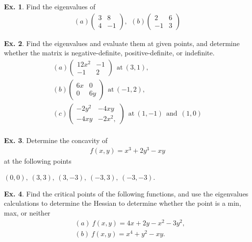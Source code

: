 \documentclass[10pt,a4paper]{book}
\theoremstyle{definition}\newtheorem{definition}{Definition}
\theoremstyle{definition}\newtheorem{fact}{Fact}
\theoremstyle{definition}\newtheorem{ex}{Ex.}
\theoremstyle{definition}\newtheorem{project}{Project}
\theoremstyle{definition}\newtheorem{problem}{Problem}
\theoremstyle{definition}\newtheorem{example}{Example}
\numberwithin{theorem}{chapter}
\numberwithin{corollary}{chapter}
\numberwithin{assumption}{chapter}
\numberwithin{definition}{chapter}
\numberwithin{prop}{chapter}
\numberwithin{notation}{chapter}
\numberwithin{problem}{chapter}
\numberwithin{example}{chapter}
\numberwithin{fact}{chapter}
\numberwithin{ex}{chapter}
\begin{document}
	
	\begin{ex}
		Find the eigenvalues of
		\begin{align*}
			(a) \begin{pmatrix}
				3 & 8 \\ 4 & - 1
			\end{pmatrix}, \ \ (b) \begin{pmatrix}
				2 & 6 \\ - 1 & 3
			\end{pmatrix}
		\end{align*}
	\end{ex}
	

	\begin{ex}
		Find the eigenvalues and evaluate them at given points, and determine whether the matrix is negative-definite, positive-definite, or indefinite.
		\begin{align*}
			(a) \begin{pmatrix}
				12 x^2 & -1   \\ -1 & 2
			\end{pmatrix} \ \ \text{at} \ (3,1), \\
			(b) \begin{pmatrix}
				6x     & 0    \\ 0 & 6y
			\end{pmatrix} \ \ \text{at} \ (-1,2), \\
			(c) \begin{pmatrix}
				-2y^2  & -4xy \\ -4xy & -2 x^2,
			\end{pmatrix} \ \ \text{at} \ (1,-1) \ \ \text{and} \ \ (1,0) \\
		\end{align*}
	\end{ex}
	
	\begin{ex}
		Determine the concavity of 
		\begin{align*}
			f(x,y) = x^3 + 2y^3 - xy 
		\end{align*}
		at the following points
		
		$(0,0), \ (3,3), \ (3,-3), \ (-3,3), \ (-3,-3)$.
	\end{ex}
	
	\begin{ex}
		Find the critical points of the following functions, and use the eigenvalues calculations to determine the Hessian to determine whether the point is a min, max, or neither
		\begin{align*}
			& (a) \ f(x,y) = 4x + 2y - x^2 - 3 y^2, \\
			& (b) \ f(x,y) = x^4 + y^2 - xy.        
		\end{align*}
	\end{ex}
	
\end{document}
